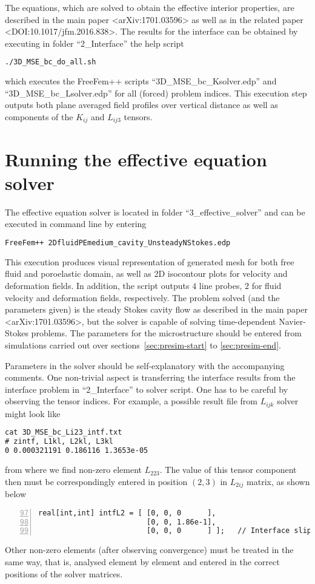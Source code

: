 \documentclass[12pt,a4paper]{article}
\begin{document}
The equations, which are solved to obtain the effective interior properties, are described in the main paper <arXiv:1701.03596> as well as in the related paper <DOI:10.1017/jfm.2016.838>. The results for the interface can be obtained by executing in folder ``2\_Interface'' the help script
\begin{lstlisting}[language=tex]
./3D_MSE_bc_do_all.sh
\end{lstlisting}
which executes the FreeFem++ scripts ``3D\_MSE\_bc\_Ksolver.edp'' and ``3D\_MSE\_bc\_Lsolver.edp'' for all (forced) problem indices. This execution step outputs both plane averaged field profiles over vertical distance as well as components of the $K_{ij}$ and $L_{ij3}$ tensors.

\section{Running the effective equation solver}

The effective equation solver is located in folder ``3\_effective\_solver'' and can be executed in command line by entering
\begin{lstlisting}[language=tex]
FreeFem++ 2DfluidPEmedium_cavity_UnsteadyNStokes.edp
\end{lstlisting}
This execution produces visual representation of generated mesh for both free fluid and poroelastic domain, as well as 2D isocontour plots for velocity and deformation fields. In addition, the script outputs $4$ line probes, $2$ for fluid velocity and deformation fields, respectively. The problem solved (and the parameters given) is the steady Stokes cavity flow as described in the main paper <arXiv:1701.03596>, but the solver is capable of solving time-dependent Navier-Stokes problems. The parameters for the microstructure should be entered from simulations carried out over sections~\ref{sec:presim-start} to \ref{sec:presim-end}.

Parameters in the solver should be self-explanatory with the accompanying comments. One non-trivial aspect is transferring the interface results from the interface problem in ``2\_Interface'' to solver script. One has to be careful by observing the tensor indices. For example, a possible result file from $L_{ijk}$ solver might look like
\begin{lstlisting}[language=tex]
cat 3D_MSE_bc_Li23_intf.txt
# zintf, L1kl, L2kl, L3kl
0 0.000321191 0.186116 1.3653e-05
\end{lstlisting}
from where we find non-zero element $L_{223}$. The value of this tensor component then must be correspondingly entered in position $(2,3)$ in $L_{2ij}$ matrix, as shown below
\begin{lstlisting}[numbers=left,firstnumber=97]
real[int,int] intfL2 = [ [0, 0, 0      ],
                         [0, 0, 1.86e-1],
                         [0, 0, 0      ] ];   // Interface slip length matrix L2kl   
\end{lstlisting}
Other non-zero elements (after observing convergence) must be treated in the same way, that is, analysed element by element and entered in the correct positions of the solver matrices.
\end{document}
